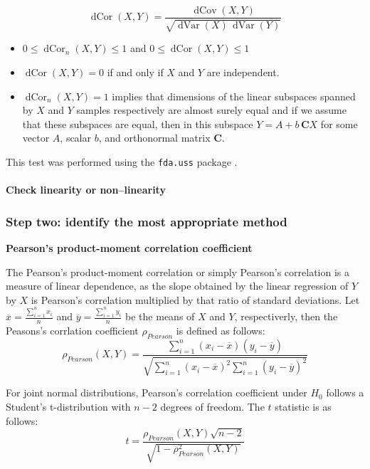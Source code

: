 \documentclass[a4paper]{article}
\begin{document}
\begin{equation}
\operatorname
{dCor}(X,Y) = \frac{\operatorname{dCov}(X,Y)}{\sqrt{\operatorname{dVar}(X)\,\operatorname{dVar}(Y)}}
\end{equation}

\begin{itemize}
\item $0\leq\operatorname{dCor}_n(X,Y)\leq1$ and $0\leq\operatorname{dCor}(X,Y)\leq1$
\item $\operatorname{dCor}(X,Y) = 0$ if and only if $X$ and $Y$ are independent.
\item $\operatorname{dCor}_n(X,Y) = 1$ implies that dimensions of the linear subspaces spanned by $X$ and $Y$ samples respectively are almost surely equal and if we assume that these subspaces are equal, then in this subspace $Y = A + b\,\mathbf{C}X$ for some vector $A$, scalar $b$, and orthonormal matrix $\mathbf{C}$.
\end{itemize}

This test was performed using the \texttt{fda.uss} package \citep{fda.usc.package}. 

\paragraph{Check linearity or non--linearity}



\subsubsection*{Step two: identify the most appropriate method} 
\textbf{Pearson's product-moment correlation coefficient}

The Pearson's product-moment correlation or simply Pearson's correlation is a measure of linear dependence, as the slope obtained by the linear regression of $Y$ by $X$ is Pearson's correlation multiplied by that ratio of standard deviations.
Let $\overline{x} = \frac{\sum_{i=1}^{n} x_{i}}{n}$ and $\overline{y} = \frac{\sum_{i=1}^{n} y_{i}}{n}$ be the means of $X$ and $Y$, respectiverly, then the Peasons's corrlation coefficient $\rho_{Pearson}$ is defined as follows: 
\begin{equation}
\rho_{Pearson}(X, Y) = \frac{\sum_{i=1}^{n}(x_{i} - \overline{x})(y_{i} - \overline{y})}
{\sqrt{\sum_{i=1}^{n}(x_{i} - \overline{x})^2  \sum_{i=1}^{n}(y_{i} - \overline{y})^2}}
\end{equation}


For joint normal distributions, Pearson's correlation coefficient under $H_{0}$ follows a Student's t-distribution with $n-2$ degrees of freedom. The $t$ statistic is as follows:
\begin{equation}
t = \frac{\rho_{Pearson}(X, Y) \sqrt{n -2}}{\sqrt{1- \rho^{2}_{Pearson}(X, Y)}}
\end{equation}
\end{document}
